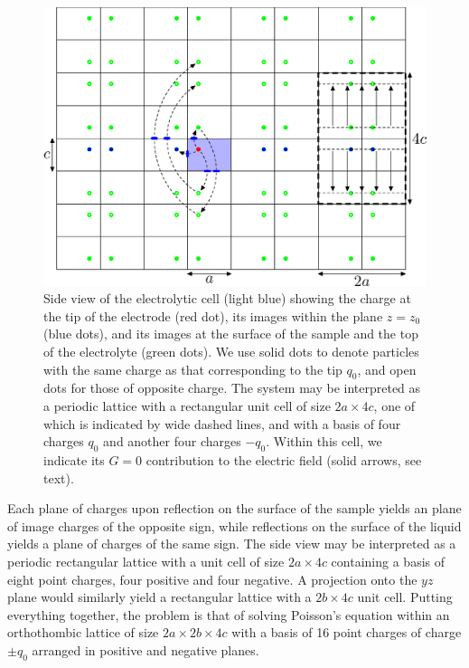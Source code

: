 \documentclass{article}
\begin{document}
\begin{figure}
  \centering
  \includegraphics[width=\textwidth]{paper-2}
  \caption{Side view of the electrolytic cell (light blue)
    showing the charge at the tip of the electrode (red dot), its
    images within the plane $z=z_0$ (blue dots), and its images at the
    surface of the sample and the top of the electrolyte (green
    dots). We use solid dots to denote particles with the same charge
    as that corresponding to the tip $q_0$, and open dots for those of
    opposite charge. The system may be interpreted as a periodic
    lattice with a rectangular unit cell of size $2a\times 4c$, one of
    which is indicated by wide dashed lines, and with a basis of four
    charges $q_0$ and another four charges $-q_0$. Within this cell,
    we indicate its $G=0$ contribution to the electric field (solid
    arrows, see text).}
  \label{fig:sideview}
\end{figure}
Each plane of charges upon reflection on the surface of the sample yields an
plane of image charges of the opposite sign, while reflections
on the surface of the liquid yields a plane of charges of the same
sign. The side view may be interpreted as a periodic rectangular
lattice with a unit cell of size $2a\times 4c$ containing a basis of eight point
charges, four positive and four negative. A projection onto the $yz$
plane would similarly yield a rectangular lattice with a  $2b\times4c$
unit cell. Putting everything together, the problem is that of solving
Poisson's equation within an orthothombic lattice of size
$2a\times2b\times4c$ with a basis of 16 point charges of charge $\pm
q_0$ arranged in positive and negative planes.
\end{document}

